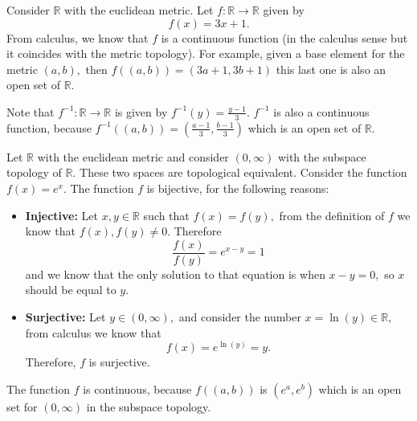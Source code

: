 \documentclass[
	fontsize=10pt, %
	twoside=false, %
	secnumdepth=1, %
]{kaobook}
\begin{document}
\begin{example}
Consider $\mathbb{R}$ with the euclidean metric. Let $f:\mathbb{R}\to\mathbb{R}$ given by $$f(x)=3x+1.$$ From calculus, we know that $f$ is a continuous function (in the calculus sense but it coincides with the metric topology). For example, given a base element for the metric $(a,b),$ then $f\left((a,b)\right)=(3a+1,3b+1)$ this last one is also an open set of $\mathbb{R}.$

Note that $f^{-1}:\mathbb{R}\to\mathbb{R}$ is given by $f^{-1}(y)=\frac{y-1}{3}.$ $f^{-1}$ is also a continuous function, because $f^{-1}\left((a,b)\right)=\left(\frac{a-1}{3},\frac{b-1}{3}\right)$ which is an open set of $\mathbb{R}.$
\end{example}

\begin{example}
Let $\mathbb{R}$ with the euclidean metric and consider $(0,\infty)$ with the subspace topology of $\mathbb{R}.$ These two spaces are topological equivalent. Consider the function $f(x)=e^x.$ The function $f$ is bijective, for the following reasons:

\begin{itemize}
\item \textbf{Injective:} Let $x,y\in \mathbb{R}$ such that $f(x)=f(y),$ from the definition of $f$ we know that $f(x),f(y)\neq 0.$ Therefore $$\frac{f(x)}{f(y)}=e^{x-y}=1$$ and we know that the only solution to that equation is when $x-y=0,$ so $x$ should be equal to $y.$

\item \textbf{Surjective:} Let $y\in(0,\infty),$ and consider the number $x=\ln(y)\in\mathbb{R},$ from calculus we know that $$f(x)=e^{\ln(y)}=y.$$ Therefore, $f$ is surjective.  
\end{itemize}

The function $f$ is continuous, because $f\left((a,b)\right)$ is $(e^a,e^b)$ which is an open set for $(0,\infty)$ in the subspace topology.
\end{example}
\end{document}
